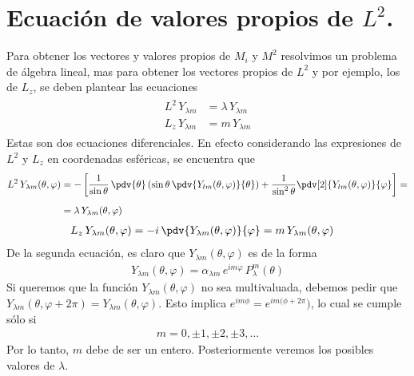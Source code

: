\section{Ecuación de valores propios de \texorpdfstring{$L^{2}$.}{L2}}
Para obtener los vectores y valores propios de $M_{i}$ y $M^{2}$ resolvimos un problema de álgebra lineal, mas para obtener los vectores propios de $L^{2}$ y por ejemplo, los de $L_{z}$, se deben plantear las ecuaciones
\begin{align}
\begin{aligned}
L^{2} \, Y_{\lambda m} &= \lambda \, Y_{\lambda m} \\[0.5em]
L_{z} \, Y_{\lambda m} &= m \, Y_{\lambda m}
\end{aligned}
\label{eq:ecuacion_10_110}
\end{align}
Estas son dos ecuaciones diferenciales. En efecto considerando las expresiones de $L^{2}$ y $L_{z}$ en coordenadas esféricas, se encuentra que
\begin{align}
L^{2} \, Y_{\lambda m} (\theta, \varphi) &= - \left[ \dfrac{1}{\sin \theta} \, \pdv{\theta} \left( \sin \theta \, \pdv{Y_{lm} (\theta, \varphi)}{\theta} \right) + \dfrac{1}{\sin^{2} \theta} \pdv[2]{Y_{lm} (\theta, \varphi)}{\varphi}  \right] = \nonumber \\[0.5em]
&= \lambda \, Y_{\lambda m} (\theta, \varphi) \label{eq:ecuacion_10_111}
\end{align}
\begin{align}
L_{z} \, Y_{\lambda m} (\theta, \varphi) &= - i \, \pdv{Y_{\lambda m} (\theta, \varphi)}{\varphi} = m \, Y_{\lambda m} (\theta, \varphi) \label{eq:ecuacion_10_112}
\end{align}
De la segunda ecuación, es claro que $Y_{\lambda m} (\theta, \varphi)$ es de la forma
\begin{align}
Y_{\lambda m} (\theta, \varphi) = \alpha_{\lambda m} \, e^{i m \varphi} \, P_{\lambda}^{m} (\theta)
\label{eq:ecuacion_10_113}
\end{align}
Si queremos que la función $Y_{\lambda m} (\theta, \varphi) $ no sea multivaluada, debemos pedir que $Y_{\lambda m} (\theta, \varphi + 2 \pi) = Y_{\lambda m} (\theta, \varphi)$. Esto implica $e^{i m \phi} = e^{i m (\phi + 2\pi})$, lo cual se cumple sólo si
\begin{align}
m = 0, \pm 1, \pm 2, \pm 3, \ldots
\label{eq:ecuacion_10_114}
\end{align}
Por lo tanto, $m$ debe de ser un entero. Posteriormente veremos los posibles valores de $\lambda$.
\par
